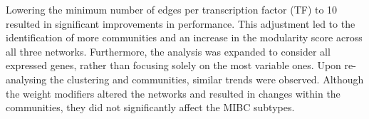Lowering the minimum number of edges per transcription factor (TF) to 10 resulted in significant improvements in performance. This adjustment led to the identification of more communities and an increase in the modularity score across all three networks. Furthermore, the analysis was expanded to consider all expressed genes, rather than focusing solely on the most variable ones. Upon re-analysing the clustering and communities, similar trends were observed. Although the weight modifiers altered the networks and resulted in changes within the communities, they did not significantly affect the MIBC subtypes.





